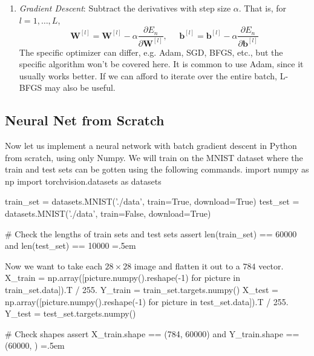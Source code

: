 \documentclass{article}
\newenvironment{cverbatim}
    {\SaveVerbatim{cverb}}
    {\endSaveVerbatim
      \flushleft\fboxrule=0pt\fboxsep=.5em
      \colorbox{cverbbg}{%
        \makebox[\dimexpr\linewidth-2\fboxsep][l]{\BUseVerbatim{cverb}}%
      }
      \endflushleft
  }
\theoremstyle{definition}
\theoremstyle{remark}
\theoremstyle{definition}
\begin{document}
\begin{enumerate}
        \item \textit{Gradient Descent}: Subtract the derivatives with step size $\alpha$. That is, for $l = 1, \ldots, L$, 
        \[\mathbf{W}^{[l]} = \mathbf{W}^{[l]} - \alpha \frac{\partial E_n}{\partial \mathbf{W}^{[l]}} , \;\;\;\;\; \mathbf{b}^{[l]} = \mathbf{b}^{[l]} - \alpha \frac{\partial E_n}{\partial \mathbf{b}^{[l]}}\]
        The specific optimizer can differ, e.g. Adam, SGD, BFGS, etc., but the specific algorithm won't be covered here. It is common to use Adam, since it usually works better. If we can afford to iterate over the entire batch, L-BFGS may also be useful. 
    \end{enumerate}

  \subsection{Neural Net from Scratch}

    Now let us implement a neural network with batch gradient descent in Python from scratch, using only Numpy. We will train on the MNIST dataset where the train and test sets can be gotten using the following commands. 
    \begin{cverbatim}
    import numpy as np 
    import torchvision.datasets as datasets

    train_set = datasets.MNIST('./data', train=True, download=True)
    test_set = datasets.MNIST('./data', train=False, download=True)

  # Check the lengths of train sets and test sets
    assert len(train_set) == 60000 and len(test_set) == 10000
    \end{cverbatim}

    Now we want to take each $28 \times 28$ image and flatten it out to a $784$ vector. 
    \begin{cverbatim}
    X_train = np.array([picture.numpy().reshape(-1) for picture in train_set.data]).T / 255.
    Y_train = train_set.targets.numpy() 
    X_test = np.array([picture.numpy().reshape(-1) for picture in test_set.data]).T / 255.
    Y_test = test_set.targets.numpy()

  # Check shapes 
    assert X_train.shape == (784, 60000) and Y_train.shape == (60000, )
    \end{cverbatim}
\end{document}
